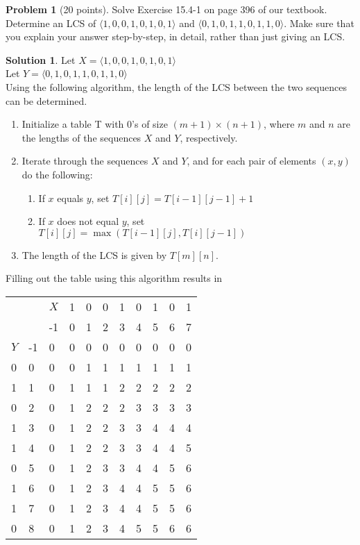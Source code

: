 \documentclass{article}
\theoremstyle{definition}
\newtheorem{problem}{Problem}
\newtheorem*{solution}{Solution}
\begin{document}
\clearpage
\begin{problem}[20 points]
  Solve Exercise 15.4-1 on page 396 of our textbook.
  Determine an LCS of $\langle 1,0,0,1,0,1,0,1\rangle$ and
  $\langle0,1,0,1,1,0,1,1,0\rangle$. Make sure that you explain your
  answer step-by-step, in detail, rather than just giving an LCS. 
\end{problem}
\begin{solution}
Let $X=\langle 1,0,0,1,0,1,0,1\rangle$\\
Let $Y=\langle0,1,0,1,1,0,1,1,0\rangle$\\
Using the following algorithm, the length of the LCS between the two sequences can be determined.
\begin{enumerate}
    \item Initialize a table T with 0's of size $(m+1)\times(n+1)$, where $m$ and $n$ are the lengths of the sequences $X$ and $Y$, respectively.
    \item Iterate through the sequences $X$ and $Y$, and for each pair of elements $(x,y)$ do the following:
    \begin{enumerate}
        \item If $x$ equals $y$, set $T[i][j]=T[i-1][j-1]+1$
        \item If $x$ does not equal $y$, set $T[i][j]=\max(T[i-1][j],T[i][j-1])$
    \end{enumerate}
    \item The length of the LCS is given by $T[m][n]$.
\end{enumerate}

\noindent
Filling out the table using this algorithm results in\\
\begin{tabular}{ll|lllllllll}
  &    & $X$  & 1 & 0 & 0 & 1 & 0 & 1 & 0 & 1 \\
  &    & -1 & 0 & 1 & 2 & 3 & 4 & 5 & 6 & 7 \\ \hline
$Y$ & -1 & 0  & 0 & 0 & 0 & 0 & 0 & 0 & 0 & 0 \\
0 & 0  & 0  & 0 & 1 & 1 & 1 & 1 & 1 & 1 & 1 \\
1 & 1  & 0  & 1 & 1 & 1 & 2 & 2 & 2 & 2 & 2 \\
0 & 2  & 0  & 1 & 2 & 2 & 2 & 3 & 3 & 3 & 3 \\
1 & 3  & 0  & 1 & 2 & 2 & 3 & 3 & 4 & 4 & 4 \\
1 & 4  & 0  & 1 & 2 & 2 & 3 & 3 & 4 & 4 & 5 \\
0 & 5  & 0  & 1 & 2 & 3 & 3 & 4 & 4 & 5 & 6 \\
1 & 6  & 0  & 1 & 2 & 3 & 4 & 4 & 5 & 5 & 6 \\
1 & 7  & 0  & 1 & 2 & 3 & 4 & 4 & 5 & 5 & 6 \\
0 & 8  & 0  & 1 & 2 & 3 & 4 & 5 & 5 & 6 & 6
\end{tabular}


\end{solution}
\end{document}
